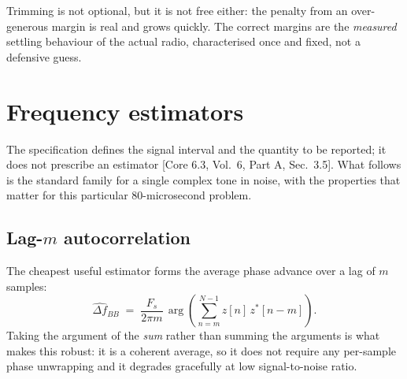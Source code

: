 \documentclass[11pt,a4paper]{article}
\newcommand{\core}[1]{\textcolor{rulegrey}{\small[Core 6.3, #1]}}
\begin{document}
Trimming is not optional, but it is not free either: the penalty from an over-generous margin is
real and grows quickly. The correct margins are the \emph{measured} settling behaviour of the actual
radio, characterised once and fixed, not a defensive guess.

\section{Frequency estimators}
\label{sec:estimators}

The specification defines the signal interval and the quantity to be reported; it does not prescribe
an estimator \core{Vol.\ 6, Part A, Sec.\ 3.5}. What follows is the standard family for a single
complex tone in noise, with the properties that matter for this particular 80-microsecond problem.

\subsection{Lag-$m$ autocorrelation}

The cheapest useful estimator forms the average phase advance over a lag of $m$ samples:
\begin{equation}
\widehat{\Delta f}_{BB} \;=\; \frac{F_s}{2\pi m}\,
\arg\!\left( \sum_{n=m}^{N-1} z[n]\,z^{*}[n-m] \right).
\label{eq:lagm}
\end{equation}
Taking the argument of the \emph{sum} rather than summing the arguments is what makes this robust:
it is a coherent average, so it does not require any per-sample phase unwrapping and it degrades
gracefully at low signal-to-noise ratio.
\end{document}
